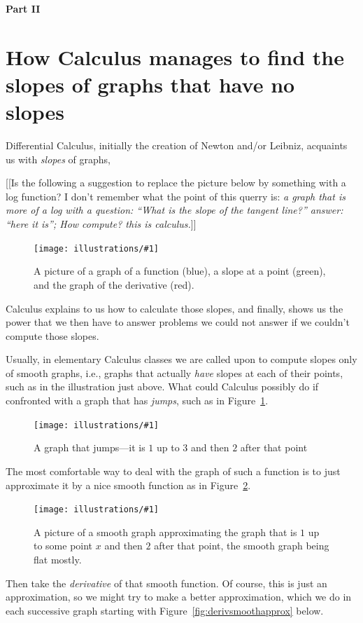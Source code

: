 \documentclass[11pt]{article}
\newcommand{\ill}[3]{ 
   \begin{figure}[H]
   \begin{center}
   \texttt{[image: illustrations/\#1]}
   \caption{#3}
   \end{center}
    \end{figure}
}
\theoremstyle{plain}
\theoremstyle{definition}
\numberwithin{equation}{section}
\numberwithin{figure}{section}
\numberwithin{table}{section}
\begin{document}
       
\bigskip   
\bigskip   
\bigskip   
\bigskip   
\centerline{\Large\bf Part II }
    
\bigskip 
\section{How Calculus manages to find the slopes of graphs that  
have no slopes}   
   
Differential Calculus, initially the creation of Newton and/or
Leibniz, acquaints us with {\em slopes} of graphs,
   

[[Is the following a suggestion to replace the picture below by something with a log function?  I don't remember what the point of this querry is: {\em a graph that is more of a log with a question: ``What is the slope
of the tangent line?'' answer: ``here it is''; How compute?  this is
calculus.}]] 
   
   
\ill{graph_slope_deriv}{0.5}{A picture of a graph of a function (blue), a slope at a point (green), and the graph of the derivative (red).}
      
\noindent Calculus explains to us how to calculate those slopes, and
finally, shows us the power that we then have to answer problems we
could not answer if we couldn't compute those slopes.


Usually, in elementary Calculus classes we are called upon to compute
slopes only of smooth graphs, i.e., graphs that actually {\em have}
slopes at each of their points, such as in the illustration just
above.  What could Calculus possibly do if confronted with a graph
that has {\em jumps}, such as in Figure~\ref{fig:jump}.
 
\ill{jump}{0.5}{A graph that jumps---it is $1$ up to $3$ and then $2$ after that point\label{fig:jump}}
  
The most comfortable way to deal with the graph of such a function is
to just approximate it by a nice smooth function as in
Figure~\ref{fig:jumpsmooth}.
    
   
\ill{jump-smooth}{0.5}{A picture of a smooth graph approximating the
  graph that is $1$ up to some point $x$ and then $2$ after that
  point, the smooth graph being flat mostly.\label{fig:jumpsmooth}}


Then take the {\em derivative} of that smooth function.  Of course,
this is just an approximation, so we might try to make a better
approximation, which we do in each successive graph starting
with Figure~\ref{fig:derivsmoothapprox} below.
\end{document}
